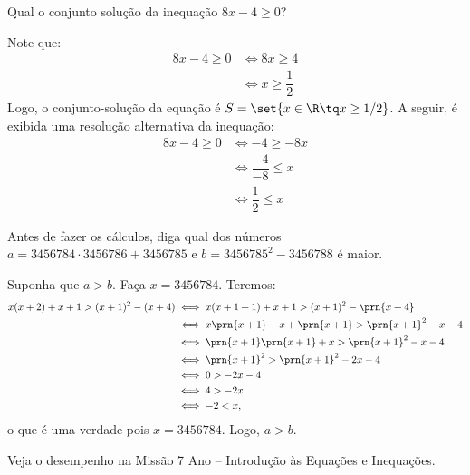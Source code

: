 \begin{example}
Qual o conjunto solução da inequação $8x - 4 \ge 0$?
\end{example}

\begin{solution}
Note que:
%
\begin{align*}
	8x-4 \ge 0 & \iff 8x \ge 4\\
	& \iff x \ge \dfrac{1}{2}
\end{align*}
%
Logo, o conjunto-solução da equação é $S = \set{x \in \R \tq x \ge 1/2}$. A seguir, é exibida uma resolução alternativa da inequação:
%
\begin{align*}
	8x-4 \ge 0 & \iff -4 \ge -8x\\
	& \iff \dfrac{-4}{-8} \le x \\
	& \iff \dfrac{1}{2} \le x 
\end{align*}
\end{solution}	

\begin{example}
Antes de fazer os cálculos, diga qual dos números $a = 3456784 \cdot 3456786 + 3456785$ e $b = 3456785^2 - 3456788$ é maior.
\end{example}

\begin{solution}
Suponha que $a > b$. Faça $x=3456784$. Teremos:
%
\begin{align*}
	x(x+2)+x+1>(x+1)^2 -(x+4)& \iff x(x+1+1)+x+1>(x+1)^2-\prn{x+4}\\
	& \iff x\prn{x+1}+x+\prn{x+1}>\prn{x+1}^2-x-4\\
	& \iff \prn{x+1}\prn{x+1}+x>\prn{x+1}^2-x-4\\
	& \iff \prn{x+1}^2>\prn{x+1}^2-2x-4\\
	& \iff 0>-2x-4\\
	& \iff 4>-2x\\
	& \iff -2<x,
\end{align*}
%
\noindent o que é uma verdade pois $x=3456784$. Logo, $a>b$.
\end{solution}


\begin{onlineact}
Veja o desempenho na Missão 7\tdeg{} Ano -- Introdução às Equações e Inequações.
\end{onlineact}
